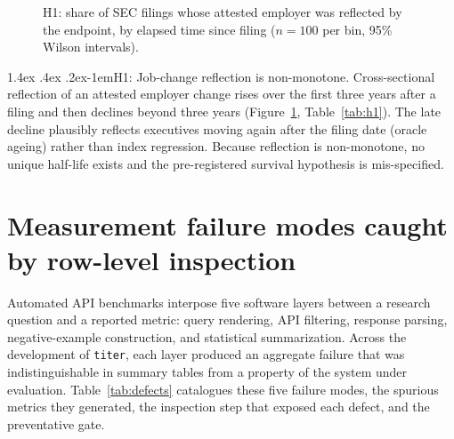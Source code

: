 \documentclass[11pt]{article}
\makeatletter
\renewcommand\paragraph{\@startsection{paragraph}{4}{\z@}%
  {1.4ex \@plus .4ex \@minus .2ex}{-1em}{\normalfont\normalsize\bfseries}}
\makeatother
\begin{document}
\begin{figure}[!tb]
\centering

\caption{H1: share of SEC filings whose attested employer was reflected by the endpoint, by elapsed time since filing ($n=100$ per bin, 95\% Wilson intervals).}
\label{fig:h1}
\end{figure}

\begin{table}[!tb]
\centering\small

\caption{Binned reflection rates underlying Figure~\ref{fig:h1}.}
\label{tab:h1}
\end{table}

\paragraph{H1: Job-change reflection is non-monotone.}
Cross-sectional reflection of an attested employer change rises over the first three years after a filing and then declines beyond three years (Figure~\ref{fig:h1}, Table~\ref{tab:h1}). The late decline plausibly reflects executives moving again after the filing date (oracle ageing) rather than index regression. Because reflection is non-monotone, no unique half-life exists and the pre-registered survival hypothesis is mis-specified.

\section{Measurement failure modes caught by row-level inspection}
\label{sec:defects}

Automated API benchmarks interpose five software layers between a research question and a reported metric: query rendering, API filtering, response parsing, negative-example construction, and statistical summarization. Across the development of \texttt{titer}, each layer produced an aggregate failure that was indistinguishable in summary tables from a property of the system under evaluation. Table~\ref{tab:defects} catalogues these five failure modes, the spurious metrics they generated, the inspection step that exposed each defect, and the preventative gate.
\end{document}

